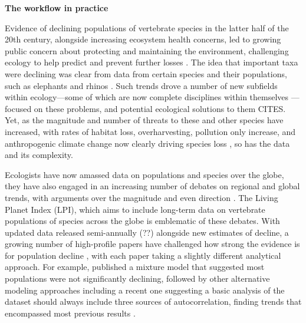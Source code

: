 \documentclass[11pt]{article}
\begin{document}
\vspace{0.5cm}
\noindent \textbf{The workflow in practice}

Evidence of declining populations of vertebrate species in the latter half of the 20th century, alongside increasing ecosystem health concerns, led to growing public concern about protecting and maintaining the environment, challenging ecology to help predict and prevent further losses \citep{soule1999conserving,soule1991conservation}. The idea that important taxa were declining was clear from data from certain species and their populations, such as elephants and rhinos \citep{soule1979benign,leader1990illegal}. Such trends drove a number of new subfields within ecology---some of which are now complete disciplines within themselves \citep[such as conservation biology,][]{soule1985conservation}---focused on these problems, and potential ecological solutions to them CITES. Yet, as the magnitude and number of threats to these and other species have increased, with rates of habitat loss, overharvesting, pollution only increase, and anthropogenic climate change now clearly driving species loss \citep{waller2017bramble}, so has the data and its complexity. 

Ecologists have now amassed data on populations and species over the globe, they have also engaged in an increasing number of debates on regional and global trends, with arguments over the magnitude and even direction \citep{Dornelas2014,Leung2020,terry2022no,muller2024weather}. The Living Planet Index (LPI), which aims to include long-term data on vertebrate populations of species across the globe is emblematic of these debates. With updated data released semi-annually (??) alongside new estimates of decline, a growing number of high-profile papers have challenged how strong the evidence is for population decline \citep{Dornelas2014,gonzalez2016estimating,wagner2021insect,muller2024weather}, with each paper taking a slightly different analytical approach. For example, \citet{Leung2020} published a mixture model that suggested most populations were not significantly declining, followed by other alternative modeling approaches \citep{Buschke2021,puurtinen2022living} including a recent one suggesting a basic analysis of the dataset should always include three sources of autocorrelation, finding trends that encompassed most previous results \citep{Johnson2024}. 
\end{document}
